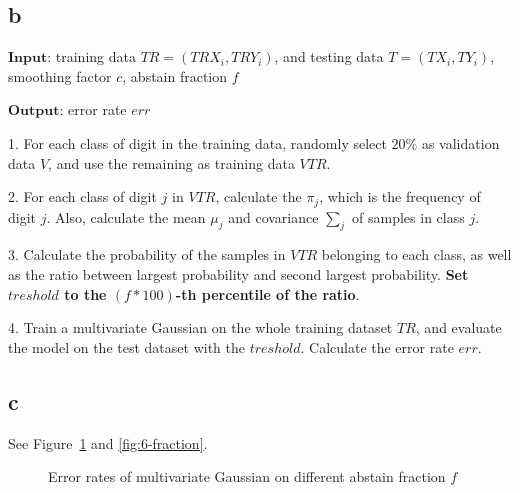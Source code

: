 \documentclass[a4paper,11pt]{article}
\theoremstyle{mytheor}
\begin{document}
\subsection*{b}
$\mathbf{Input}$: training data $TR = (TRX_i, TRY_i)$, and testing data $T = (TX_i, TY_i)$, smoothing factor $c$, abstain fraction $f$

$\mathbf{Output}$: error rate $err$

1. For each class of digit in the training data, randomly select $20\%$ as validation data $V$, and use the remaining as training data $VTR$.

2. For each class of digit $j$ in $VTR$, calculate the $\pi_j$, which is the frequency of digit $j$. Also, calculate the mean $\mu_j$ and covariance $\sum_{j}$ of samples in class $j$.

3. Calculate the probability of the samples in $VTR$ belonging to each class,
as well as the ratio between largest probability and second largest probability.
\textbf{Set $treshold$ to the $(f*100)$-th percentile of the ratio}. 

4. Train a multivariate Gaussian on the whole training dataset $TR$, and evaluate the model on the test dataset with the $treshold$. Calculate the error rate $err$.

\subsection*{c}
See Figure~\ref{fig:6-error} and \ref{fig:6-fraction}.

\begin{figure}[h]
	\caption{Error rates of multivariate Gaussian on different abstain fraction $f$}
	\label{fig:6-error}
\end{figure}
\end{document}
